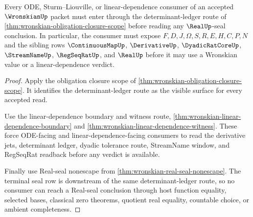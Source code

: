 \begin{theorem}
\label{thm:wronskian-differential-equation-consumer-handoff}
Every ODE, Sturm--Liouville, or linear-dependence consumer of an accepted $\WronskianUp$ packet must enter through the determinant-ledger route of \autoref{thm:wronskian-obligation-closure-scope} before reading any $\RealUp$-seal conclusion. In particular, the consumer must expose $F,D,J,\Omega,S,R,E,H,C,P,N$ and the sibling rows $\ContinuousMapUp$, $\DerivativeUp$, $\DyadicRatCoreUp$, $\StreamNameUp$, $\RegSeqRatUp$, and $\RealUp$ before it may use a Wronskian value or a linear-dependence verdict.
\end{theorem}
\begin{proof}
Apply the obligation closure scope of \autoref{thm:wronskian-obligation-closure-scope}. It identifies the determinant-ledger route as the visible surface for every accepted read.

Use the linear-dependence boundary and witness route, \autoref{thm:wronskian-linear-dependence-boundary} and \autoref{thm:wronskian-linear-dependence-witness}. These force ODE-facing and linear-dependence-facing consumers to read the derivative jets, determinant ledger, dyadic tolerance route, StreamName window, and RegSeqRat readback before any verdict is available.

Finally use Real-seal nonescape from \autoref{thm:wronskian-real-seal-nonescape}. The terminal seal row is downstream of the same determinant-ledger route, so no consumer can reach a Real-seal conclusion through host function equality, selected bases, classical zero theorems, quotient real equality, countable choice, or ambient completeness.
\end{proof}

